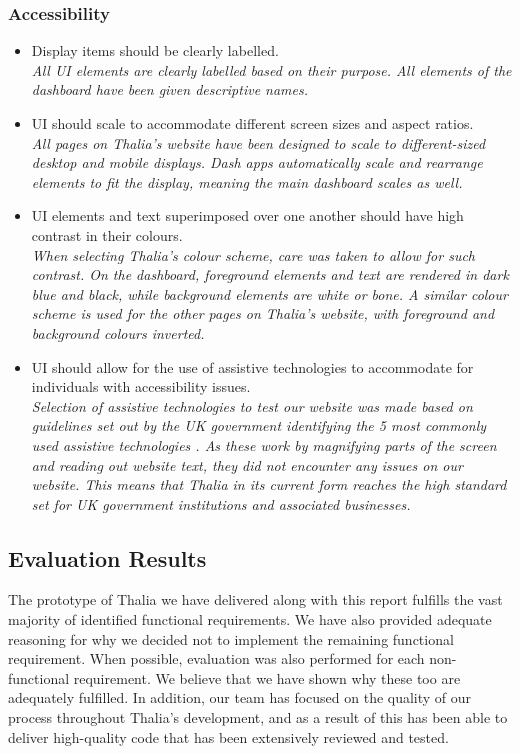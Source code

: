 \documentclass[main.tex]{subfiles}
\begin{document}
\subsubsection{Accessibility}
\begin{itemize}
    \item Display items should be clearly labelled.\\
    \textit{All UI elements are clearly labelled based on their purpose. All elements of the dashboard have been given descriptive names.}
    \item UI should scale to accommodate diﬀerent screen sizes and aspect ratios.\\
    \textit{All pages on Thalia's website have been designed to scale to different-sized desktop and mobile displays. Dash apps automatically scale and rearrange elements to fit the display, meaning the main dashboard scales as well.}
    \item UI elements and text superimposed over one another should have high contrast in their colours.\\
    \textit{When selecting Thalia’s colour scheme, care was taken to allow for such contrast. On the dashboard, foreground elements and text are rendered in dark blue and black, while background elements are white or bone. A similar colour scheme is used for the other pages on Thalia’s website, with foreground and background colours inverted.}
    
    \item UI should allow for the use of assistive technologies to accommodate for individuals with accessibility issues.\\
    \textit{Selection of assistive technologies to test our website was made based on guidelines set out by the UK government identifying the 5 most commonly used assistive technologies \cite{govUKAccessability}. As these work by magnifying parts of the screen and reading out website text, they did not encounter any issues on our website. This means that Thalia in its current form reaches the high standard set for UK government institutions and associated businesses.}

\end{itemize}

\subsection{Evaluation Results}
    The prototype of Thalia we have delivered along with this report fulfills the vast majority of identified functional requirements. We have also provided adequate reasoning for why we decided not to implement the remaining functional requirement. When possible, evaluation was also performed for each non-functional requirement. We believe that we have shown why these too are adequately fulfilled. In addition, our team has focused on the quality of our process throughout Thalia’s development, and as a result of this has been able to deliver high-quality code that has been extensively reviewed and tested. 
\end{document}
